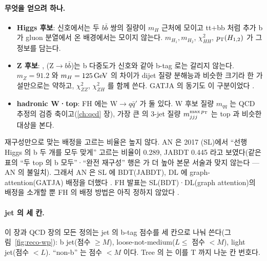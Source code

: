 \paragraph{무엇을 얻으려 하나.}
\begin{itemize}
\item \textbf{Higgs 후보}: 신호에서는 두 $b\bar b$ 쌍의 질량이 $m_H$ 근처에 모이고 tt+bb 처럼 추가 b 가 gluon 분열에서 온 배경에서는 모이지 않는다.
      $m_{H_1}, m_{H_2}$, $\chi^2_{HH}$, $p_{\mathrm{T}}(H_{1,2})$ 가 그 정보를 담는다.
\item \textbf{Z 후보}: \ttZH{}, \ttZZ{}(Z$\to b\bar b$)는 b 다중도가 신호와 같아 b-tag 로는 갈리지 않는다. $m_Z=91.2$ 와 $m_H=125\,\mathrm{GeV}$ 의 차이가
      dijet 질량 분해능과 비슷한 크기라 한 가설만으로는 약하고, $\chi^2_{ZZ}$, $\chi^2_{ZH}$ 를 함께 쓴다. GATJA 의 동기도 이 구분이었다
      .
\item \textbf{hadronic W·top}: FH 에는 W$\to q\bar q'$ 가 둘 있다. W 후보 질량 $m_{qq}$ 는 QCD 추정의 검증 축이고(\ref{ch:qcd} 장),
      가장 큰 \pt{} 의 3-jet 질량 $m_{jjj}^{\max p_{\mathrm{T}}}$ 는 top 과 비슷한 대상을 본다.
\end{itemize}
\chisq{} 재구성만으로 맞는 배정을 고르는 비율은 높지 않다. AN 은 2017 \ttHH{}(SL)에서 ``선행 Higgs 의 b 두 개를 모두 맞게'' 고르는 비율이
\chisq{} 0.289, JABDT 0.445 라고 보였다(같은 표의 ``두 top 의 b 모두''·``완전 재구성'' 행은 \chisq{} 가 더
높아 본문 서술과 맞지 않는다 — AN 의 불일치). 그래서 AN 은 SL 에 BDT(JABDT), DL 에 graph-attention(GATJA) 배정을 더했다
. FH 발표는 SL(BDT)·DL(graph attention)의 배정을 소개할 뿐 FH 의 배정 방법은 아직 정하지 않았다
.

\paragraph{jet 의 세 칸.}
이 장과 QCD 장의 모든 정의는 jet 의 b-tag 점수를 세 칸으로 나눠 쓴다(그림~\ref{fig:reco-wp}): b jet(점수 $\ge M$), loose-not-medium($L\le$ 점수 $<M$),
light jet(점수 $<L$). ``non-b'' 는 점수 $<M$ 이다. Tree 의  는 이를 T 까지 나눈 칸 번호다.

